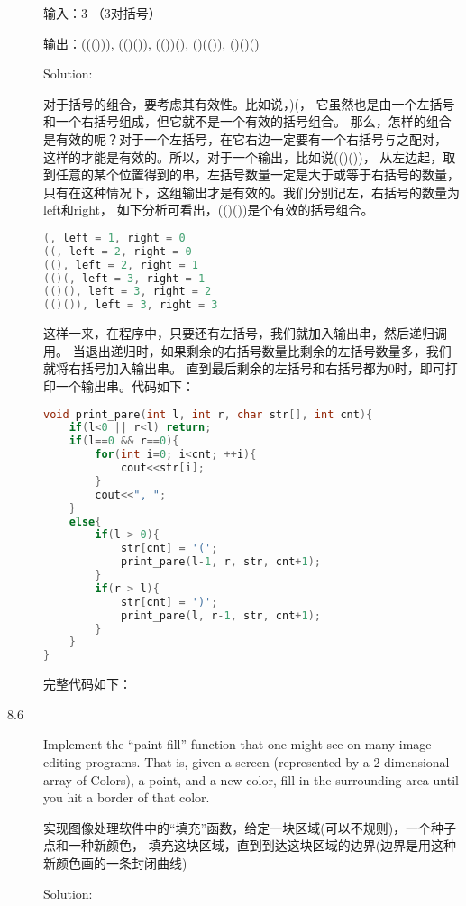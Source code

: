 \begin{description}
输入：3 （3对括号）

输出：((())), (()()), (())(), ()(()), ()()()

Solution: 

对于括号的组合，要考虑其有效性。比如说，)(， 它虽然也是由一个左括号和一个右括号组成，但它就不是一个有效的括号组合。 那么，怎样的组合是有效的呢？对于一个左括号，在它右边一定要有一个右括号与之配对， 这样的才能是有效的。所以，对于一个输出，比如说(()())， 从左边起，取到任意的某个位置得到的串，左括号数量一定是大于或等于右括号的数量， 只有在这种情况下，这组输出才是有效的。我们分别记左，右括号的数量为left和right， 如下分析可看出，(()())是个有效的括号组合。
\begin{lstlisting}[language=C++]
(, left = 1, right = 0
((, left = 2, right = 0
((), left = 2, right = 1
(()(, left = 3, right = 1
(()(), left = 3, right = 2
(()()), left = 3, right = 3
\end{lstlisting}
这样一来，在程序中，只要还有左括号，我们就加入输出串，然后递归调用。 当退出递归时，如果剩余的右括号数量比剩余的左括号数量多，我们就将右括号加入输出串。 直到最后剩余的左括号和右括号都为0时，即可打印一个输出串。代码如下：
\begin{lstlisting}[language=C++]
void print_pare(int l, int r, char str[], int cnt){
    if(l<0 || r<l) return;
    if(l==0 && r==0){
        for(int i=0; i<cnt; ++i){
            cout<<str[i];
        }
        cout<<", ";
    }
    else{
        if(l > 0){
            str[cnt] = '(';
            print_pare(l-1, r, str, cnt+1);
        }
        if(r > l){
            str[cnt] = ')';
            print_pare(l, r-1, str, cnt+1);
        }
    }
}
\end{lstlisting}
完整代码如下：



\item[8.6] Implement the “paint fill” function that one might see on many image editing programs. That is, given a screen (represented by a 2-dimensional array of Colors), a point, and a new color, fill in the surrounding area until you hit a border of that color.

实现图像处理软件中的“填充”函数，给定一块区域(可以不规则)，一个种子点和一种新颜色， 填充这块区域，直到到达这块区域的边界(边界是用这种新颜色画的一条封闭曲线)

Solution: 


\end{description}
